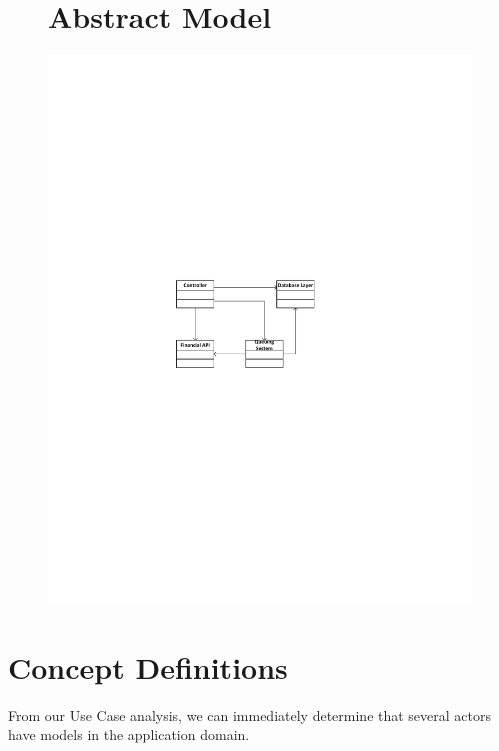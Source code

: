 \begin{figure}
\section{Abstract Model}
\centering
\includegraphics[width=5.5in]{./img/AbstractModel.pdf}
\caption{ }
\end{figure}

\section{Concept Definitions}

From our Use Case analysis, we can immediately determine that several
actors have models in the application domain.

